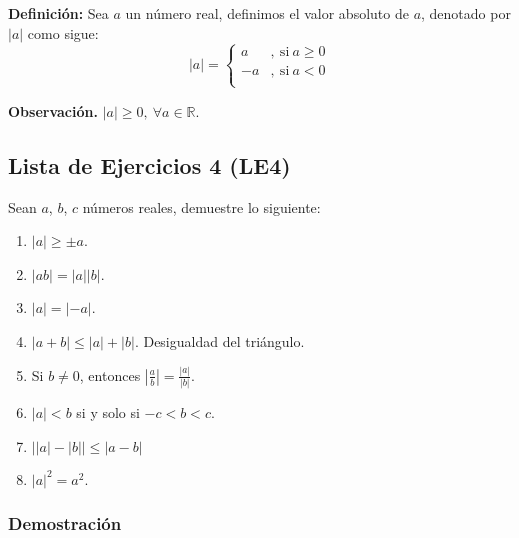\documentclass[11pt]{article}
\newcommand{\R}{\mathbb{R}}
\begin{document}
\textbf{Definición:} Sea $a$ un número real, definimos el valor absoluto de $a$, denotado por $|a|$ como sigue: 
    \[
    |a| = 
    \left \{
        \begin{aligned}
        a &,\ \text{si} \ a \geq 0\\
        -a &,\ \text{si} \ a < 0 \\
        \end{aligned}
    \right .
    \]

\textbf{Observación.} $|a|\geq 0, \ \forall a\in \R$.

\subsection*{Lista de Ejercicios 4 (LE4)}

Sean $a$, $b$, $c$ números reales, demuestre lo siguiente:

\begin{enumerate}[label=\alph*)]
    \item $|a| \geq \pm a$. %
    \item $|ab|=|a||b|$. %
    \item $|a|=|-a|$. %
    \item $|a+b|\leq |a|+|b|$. Desigualdad del triángulo. %
    \item Si $b\neq 0$, entonces $\left| \frac{a}{b} \right| = \frac{|a|}{|b|}$. %
    \item $|a|<b$ si y solo si $-c<b<c$. %
    \item $ \big| |a|-|b| \big| \leq |a-b|$ %
    \item $|a|^2=a^2$.
\end{enumerate}

\subsubsection*{Demostración}
\end{document}
